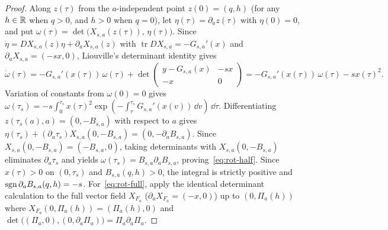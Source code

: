 \begin{proof}
Along $z(\tau)$ from the $a$-independent point $z(0)=(q,h)$ (for any $h\in\mathbb{R}$ when $q>0$, and $h>0$ when $q=0$), let $\eta(\tau)=\partial_a z(\tau)$ with $\eta(0)=0$, and put $\omega(\tau)=\det\big(X_{s,a}(z(\tau)),\,\eta(\tau)\big)$. Since $\dot\eta=DX_{s,a}(z)\eta+\partial_a X_{s,a}(z)$ with $\operatorname{tr} DX_{s,a}=-G_{s,a}'(x)$ and $\partial_a X_{s,a}=(-sx,0)$, Liouville's determinant identity gives
\[
  \dot\omega(\tau) = -G_{s,a}'(x(\tau))\,\omega(\tau) + \det\!\begin{pmatrix} y-G_{s,a}(x) & -sx \\ -x & 0 \end{pmatrix} = -G_{s,a}'(x(\tau))\,\omega(\tau) - s x(\tau)^2.
\]
Variation of constants from $\omega(0)=0$ gives $\omega(\tau_s)=-s\int_0^{\tau_s}x(\tau)^2\exp(-\int_\tau^{\tau_s}G_{s,a}'(x(v))\,\dd v)\,\dd\tau$. Differentiating $z(\tau_s(a),a)=(0,-B_{s,a})$ with respect to $a$ gives $\eta(\tau_s)+(\partial_a\tau_s)X_{s,a}(0,-B_{s,a})=(0,-\partial_a B_{s,a})$. Since $X_{s,a}(0,-B_{s,a})=(-B_{s,a},0)$, taking determinants with $X_{s,a}(0,-B_{s,a})$ eliminates $\partial_a\tau_s$ and yields $\omega(\tau_s)=B_{s,a}\partial_a B_{s,a}$, proving~\eqref{eq:rot-half}. Since $x(\tau)>0$ on $(0,\tau_s)$ and $B_{s,a}(q,h)>0$, the integral is strictly positive and $\operatorname{sgn}\partial_a B_{s,a}(q,h)=-s$. For~\eqref{eq:rot-full}, apply the identical determinant calculation to the full vector field $X_{F_a}$ ($\partial_a X_{F_a}=(-x,0)$) up to $(0,\Pi_a(h))$ where $X_{F_a}(0,\Pi_a(h))=(\Pi_a(h),0)$ and $\det\big((\Pi_a,0),(0,\partial_a \Pi_a)\big)=\Pi_a\partial_a \Pi_a$.
\end{proof}

